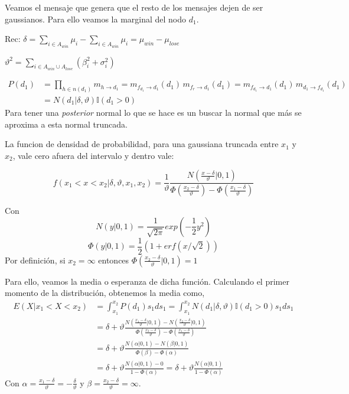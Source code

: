 \documentclass[11pt,twoside, spanish]{report} %
\begin{document}
Veamos el mensaje que genera que el resto de los mensajes dejen de ser gaussianos. Para ello veamos la marginal del nodo $d_1$.

Rec: $\delta = \sum_{i\in A_{win}}\mu_i-\sum_{i\in A_{win}}\mu_i= \mu_{win}-\mu_{lose}$

$\vartheta^2 = \sum_{i\in A_{win}\cup A_{lose}}(\beta_i^2+\sigma_i^2)	$

\begin{equation}\label{eq:p_d}
	\begin{split}
		P(d_1) & =  \prod_{h \in n(d_1)} m_{h \rightarrow d_1} = m_{f_{d_1} \rightarrow d_1}(d_1) \, m_{f_r \rightarrow d_1}(d_1) = m_{f_{d_1} \rightarrow d_1}(d_1) \, m_{d_1 \rightarrow f_{d_1}}(d_1)  \\
		& = N(d_1|\delta,\vartheta) \mathbb{I}(d_1 > 0)
	\end{split}
\end{equation}
Para tener una \textit{posterior} normal lo que se hace es un buscar la normal que m\'as se aproxima a esta normal truncada.

La funcion de densidad de probabilidad, para una gaussiana truncada entre $x_1$ y $x_2$, vale cero afuera del intervalo  y dentro vale:

\begin{equation}
	f(x_1<x<x_2|\delta,\vartheta,x_1,x_2) = \frac{1}{\vartheta}\frac{N\left(\frac{x-\delta}{\vartheta}|0,1\right)}{\Phi\left(\frac{x_2-\delta}{\vartheta}\right)-\Phi\left(\frac{x_1-\delta}{\vartheta}\right)}
\end{equation}

Con
\begin{equation}
	N(y|0,1) = \frac{1}{\sqrt{2\pi}}exp\left(-\frac{1}{2}y^2\right)
\end{equation}
\begin{equation}
	\Phi(y|0,1) = \frac{1}{2}(1+erf(x/\sqrt{2}))
\end{equation}
Por definici\'on, si $x_2=\infty$ entonces $\Phi\left(\frac{x_2-\delta}{\vartheta}|0,1\right)=1$

Para ello, veamos la media o esperanza de dicha funci\'on.
Calculando el primer momento de la distribuci\'on, obtenemos la media como,
\begin{equation}\label{eq:mean_aprox_double}
	\begin{split}
		E(X| x_1 < X < x_2) &=  \int_{x_1}^{x_2} P(d_1)s_1ds_1 = \int_{x_1}^{x_2}  N(d_1|\delta,\vartheta) \mathbb{I}(d_1 > 0)s_1ds_1 \\
		&= \delta + \vartheta \frac{N(\frac{x_1-\delta}{\vartheta}|0,1) - N(\frac{x_2-\delta}{\vartheta}|0,1) }{\Phi(\frac{x_2-\delta}{\vartheta}) - \Phi(\frac{x_1-\delta}{\vartheta}) } \\
		&= \delta +\vartheta \frac{N(\alpha|0,1) - N(\beta|0,1) }{\Phi(\beta) - \Phi(\alpha) }\\
		& = \delta + \vartheta \frac{N(\alpha|0,1) - 0 }{1 - \Phi(\alpha) } = \delta + \vartheta \frac{N(\alpha|0,1)}{1 - \Phi(\alpha) }
	\end{split}
\end{equation}
Con $\alpha=\frac{x_1-\delta}{\vartheta}=-\frac{\delta}{\vartheta}$ y $\beta=\frac{x_2-\delta}{\vartheta}=\infty$.
\end{document}
